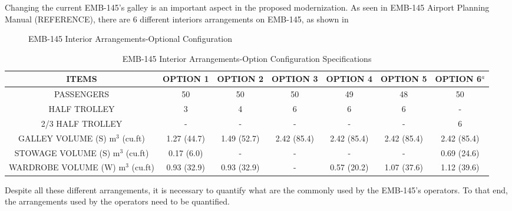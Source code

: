 Changing the current EMB-145's galley is an important aspect in the proposed modernization. As seen in EMB-145 Airport Planning Manual (REFERENCE), there are 6 different interiors arrangements on EMB-145, as shown in

\begin{figure}[H]
\caption{EMB-145 Interior Arrangements-Optional Configuration}
\label{fig:InteriorArrangements}
\end{figure}


\begin{table}[htbp]
  \centering
  \caption{EMB-145 Interior Arrangements-Option Configuration Specifications}
    \begin{tabular}{ccccccc}
    \toprule
    \textbf{ITEMS} & \textbf{OPTION 1} & \textbf{OPTION 2} & \textbf{OPTION 3} & \textbf{OPTION 4} & \textbf{OPTION 5} & \textbf{OPTION 6$^{a}$} \\
    \midrule
    PASSENGERS & 50    & 50    & 50    & 49    & 48    & 50 \\
    HALF TROLLEY & 3     & 4     & 6     & 6     & 6     & - \\
    2/3 HALF TROLLEY & -     & -     & -     & -     & -     & 6 \\
    GALLEY VOLUME (S) m$^{3}$ (cu.ft) & 1.27 (44.7) & 1.49 (52.7) & 2.42 (85.4) & 2.42 (85.4) & 2.42 (85.4) & 2.42 (85.4) \\
    STOWAGE VOLUME (S) m$^{3}$ (cu.ft) & 0.17 (6.0) & -     & -     & -     & -     & 0.69 (24.6) \\
    WARDROBE VOLUME (W) m$^{3}$ (cu.ft) & 0.93 (32.9) & 0.93 (32.9) & -     & 0.57 (20.2) & 1.07 (37.6) & 1.12 (39.6) \\
    \bottomrule
    \end{tabular}%
  \label{tab:InteriogArrangementOption}%
\end{table}%

Despite all these different arrangements, it is necessary to quantify what are the commonly used by the EMB-145's operators. To that end, the arrangements used by the operators need to be quantified.


